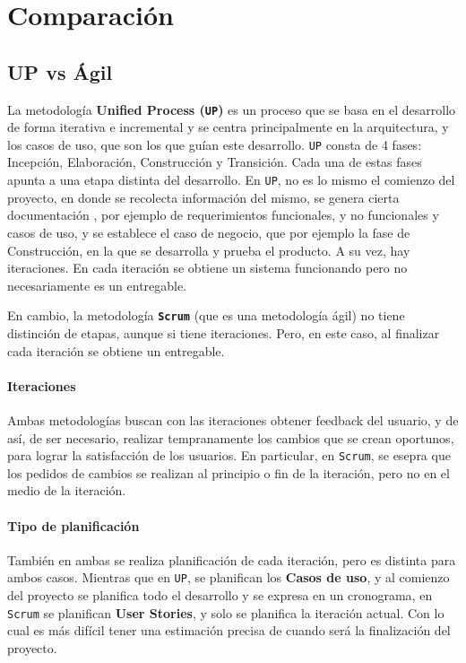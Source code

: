 \section{Comparación}

\subsection{UP vs Ágil}

La metodología \textbf{Unified Process (\texttt{UP})} es un proceso que se basa en el desarrollo de forma iterativa e incremental y se centra principalmente en la arquitectura, y los casos de uso, que son los que guían este desarrollo.
\texttt{UP} consta de 4 fases: Incepción, Elaboración, Construcción y Transición. Cada una de estas fases apunta a una etapa distinta del desarrollo. En \texttt{UP}, no es lo mismo el comienzo del proyecto, en donde se recolecta información del mismo, se genera cierta documentación , por ejemplo de requerimientos funcionales, y no funcionales y casos de uso, y se establece el caso de negocio, que por ejemplo la fase de Construcción, en la que se desarrolla y prueba el producto. 
A su vez, hay iteraciones. En cada iteración se obtiene un sistema funcionando pero no necesariamente es un entregable.

En cambio, la metodología \textbf{\texttt{Scrum}} (que es una metodología ágil) no tiene distinción de etapas, aunque si tiene iteraciones. Pero, en este caso, al finalizar cada iteración se obtiene un entregable.

\paragraph{Iteraciones}
Ambas metodologías buscan con las iteraciones obtener feedback del usuario, y de así, de ser necesario, realizar tempranamente los cambios que se crean oportunos, para lograr la satisfacción de los usuarios. En particular, en \texttt{Scrum}, se esepra que los pedidos de cambios se realizan al principio o fin de la iteración, pero no en el medio de la iteración.

\paragraph{Tipo de planificación} 
También en ambas se realiza planificación de cada iteración, pero es distinta para ambos casos. Mientras que en \texttt{UP}, se planifican los \textbf{Casos de uso}, y al comienzo del proyecto se planifica todo el desarrollo y se expresa en un cronograma, en \texttt{Scrum} se planifican \textbf{User Stories}, y solo se planifica la iteración actual. Con lo cual es más difícil tener una estimación precisa de cuando será la finalización del proyecto.

